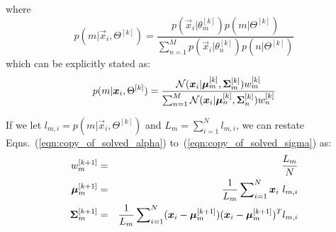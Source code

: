 \noindent
where
%
\begin{equation}
	p(m | \Vec{x}_i, \Theta^{[k]}) = \frac{ p(\Vec{x}_i | \theta_{m}^{[k]}) p(m | \Theta^{[k]}) }{ \sum\nolimits_{n=1}^{M} p(\Vec{x}_i | \theta_{n}^{[k]}) p(n | \Theta^{[k]})}
\end{equation}
%
which can be explicitly stated as:
%
\begin{equation}
	p(m | {\boldsymbol{x}}_i, \Theta^{[k]}) = \frac{ {\mathcal{N}}( {\boldsymbol{x}}_i | {\boldsymbol{\mu}}_m^{[k]},  {\boldsymbol{\Sigma}}_m^{[k]} )  w_m^{[k]} }
										{ \sum\nolimits_{n=1}^{M} {\mathcal{N}}( {\boldsymbol{x}}_i | {\boldsymbol{\mu}}_n^{[k]}, {\boldsymbol{\Sigma}}_n^{[k]} ) w_n^{[k]} }
\end{equation}

\noindent
If we let $l_{m,i} = p(m | \Vec{x}_i, \Theta^{[k]})$ and $L_m = \sum\nolimits_{i=1}^{N} l_{m,i} $, we can restate Eqns.~(\ref{eqn:copy_of_solved_alpha})
to~(\ref{eqn:copy_of_solved_sigma}) as:
%
\begin{eqnarray}
	w_m^{[k+1]}	& = & \frac{L_m}{N} \\  
	{\boldsymbol{\mu}}_m^{[k+1]} & = & \frac{1}{L_m} \sum\nolimits_{i=1}^{N} {\boldsymbol{x}}_i ~ l_{m,i} \\
	{\boldsymbol{\Sigma}}_m^{[k+1]}	& = & \frac{1}{L_m} \sum\nolimits_{i=1}^{N} ({\boldsymbol{x}}_i - {\boldsymbol{\mu}}_m^{[k+1]}) ({\boldsymbol{x}}_i - {\boldsymbol{\mu}}_m^{[k+1]})^T  l_{m,i}
\end{eqnarray}
